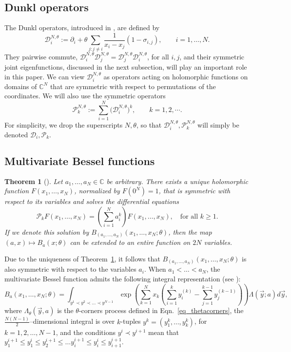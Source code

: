 \documentclass[11pt]{article}
\theoremstyle{plain}
\newtheorem{theorem}[lemma]{Theorem}
\renewcommand{\P}{\mathcal P}
\newcommand{\D}{\mathcal D}
\newcommand{\C}{\mathbb C}
\begin{document}
\subsection{Dunkl operators}


The Dunkl operators, introduced in \cite{D}, are defined by
\[
\D_i^{N,\theta} := \partial_i + \theta\sum_{j\colon j\ne i} \frac{1}{x_i-x_j}(1-\sigma_{i,j}),\qquad i=1,\dots,N.
\]
They pairwise commute, $\D_i^{N,\theta}\D_j^{N,\theta} = \D_j^{N,\theta}\D_i^{N,\theta}$, for all $i,j$, and their symmetric joint eigenfunctions, discussed in the next subsection, will play an important role in this paper.
We can view $\D_i^{N,\theta}$ as operators acting on holomorphic functions on domains of $\C^N$ that are symmetric with respect to permutations of the coordinates.
We will also use the symmetric operators
\[
\P_k^{N,\theta} := \sum_{i=1}^N{ \Big(\D_i^{N,\theta}\Big)^k },\qquad k=1,2,\cdots.
\]
For simplicity, we drop the superscripts $N,\theta$, so that $\D_i^{N,\theta}, \P_k^{N,\theta}$ will simply be denoted $\D_i, \P_k$.



\subsection{Multivariate Bessel functions}\label{sec:mbf}


\begin{theorem}[\cite{O}]\label{thm:bessel_existence}
    Let $a_1,\dots,a_N\in\C$ be arbitrary. There exists a unique holomorphic function $F(x_1,\dots,x_N)$, normalized by $F(0^N)=1$, that is symmetric with respect to its variables and solves the differential equations
    \[
    \P_k F(x_1,\dots,x_N) = \left( \sum_{i=1}^N{a_i^k} \right)F(x_1,\dots,x_N),\quad\textrm{for all }k\ge 1.
    \]
    If we denote this solution by $B_{(a_1,\dots,a_N)}(x_1,\dots,x_N;\theta)$, then the map $(a,x)\mapsto B_a(x;\theta)$ can be extended to an entire function on $2N$ variables.
\end{theorem}

Due to the uniqueness of Theorem~\ref{thm:bessel_existence}, it follows that $B_{(a_1,\dots,a_N)}(x_1,\dots,x_N;\theta)$ is also symmetric with respect to the variables $a_i$.
When $a_1<\dots<a_N$, the multivariate Bessel function admits the following integral representation (see \cite[Prop.~3.3]{Cue}):
\begin{equation}\label{eq_besselbranching}
B_a(x_1,\dots,x_N;\theta)=\int_{y^1\prec y^2\prec\dots\prec y^{N-1}}\exp\left(\sum_{k=1}^{N}x_{k}\left(\sum_{i=1}^{k}y^{(k)}_{i}-\sum_{j=1}^{k-1}y^{(k-1)}_{j}\right)\right)\Lambda(\vec{y};a)d\vec{y},
\end{equation}
where $\Lambda_{\theta}(\vec{y},a)$ is the $\theta$-corners process defined in Eqn.~\eqref{eq_thetacorners}, the $\frac{N(N-1)}{2}$--dimensional integral is over $k$-tuples $y^k=(y^k_1,\dots,y^k_k)$, for $k=1,2,\dots,N-1$, and the conditions $y^i\prec y^{i+1}$ mean that $y^{i+1}_1\le y^{i}_1\le y^{i+1}_2\le\dots y^{i+1}_i\le y^{i}_i\le y^{i+1}_{i+1}$.
\end{document}
